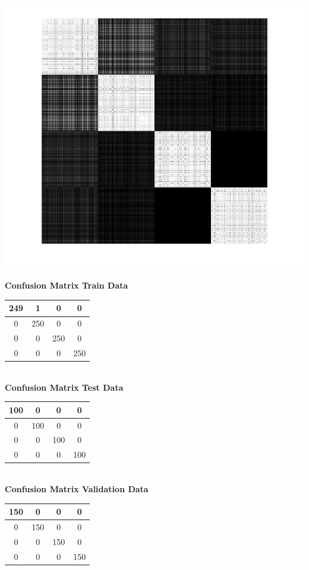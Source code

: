 \documentclass{article}
\begin{document}
\begin{center}
\includegraphics[scale=1]{Classification/1a/nu_g/kgm}
\end{center}
\begin{flushleft}
\textbf{Confusion Matrix Train Data\\[5pt]}
\begin{tabular}{|c|c|c|c|}
\hline
249 & 1 & 0 & 0 \\
\hline
0 & 250 & 0 & 0 \\
\hline
0 & 0 & 250 & 0 \\
\hline
0 & 0 & 0 & 250 \\
\hline
\end{tabular}
\textbf{\\[10pt] Confusion Matrix Test Data \\[5pt]}
\begin{tabular}{|c|c|c|c|}
\hline
100 & 0 & 0 & 0 \\
\hline
0 & 100 & 0 & 0 \\
\hline
0 & 0 & 100 & 0 \\
\hline
0 & 0 & 0 & 100 \\
\hline
\end{tabular}
\textbf{\\[10pt] Confusion Matrix Validation Data \\[5pt]}
\begin{tabular}{|c|c|c|c|}
\hline
150 & 0 & 0 & 0 \\
\hline
0 & 150 & 0 & 0 \\
\hline
0 & 0 & 150 & 0 \\
\hline
0 & 0 & 0 & 150 \\
\hline
\end{tabular}
\end{flushleft}
\end{document}
